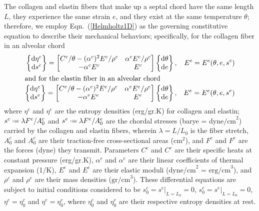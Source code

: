The collagen and elastin fibers that make up a septal chord have the same length $L$, they experience the same strain $e$, and they exist at the same temperature $\theta$; therefore, we employ Eqn.~(\ref{Helmholtz1D}) as the governing constitutive equation to describe their mechanical behaviors; specifically, for the collagen fiber in an alveolar chord
\begin{subequations}
    \label{alveolarChord}
    \begin{align}
    \left\{ \begin{matrix} 
    \mathrm{d} \eta^c \\ \mathrm{d} s^c
    \end{matrix} \right\} = \begin{bmatrix}
    C^c / \theta - ( \alpha^c )^2 E^c / \rho^c & \alpha^c E^c / \rho^c \\
    -\alpha^c E^c & E^c
    \end{bmatrix} \left\{ \begin{matrix}
    \mathrm{d} \theta \\ \mathrm{d} e
    \end{matrix} \right\} , & & 
    E^c = E^c ( \theta , e , s^c ) \\
    \intertext{and for the elastin fiber in an alveolar chord}
    \left\{ \begin{matrix} 
    \mathrm{d} \eta^e \\ \mathrm{d} s^e
    \end{matrix} \right\} = \begin{bmatrix}
    C^e / \theta - ( \alpha^e )^2 E^e / \rho^e & \alpha^e E^e / \rho^e \\
    -\alpha^e E^e & E^e
    \end{bmatrix} \left\{ \begin{matrix}
    \mathrm{d} \theta \\ \mathrm{d} e
    \end{matrix} \right\} , & &
    E^e = E^e ( \theta , e , s^e )
    \end{align}
\end{subequations}
where $\eta^c$ and $\eta^e$ are the entropy densities (erg/gr.K) for collagen and elastin; $s^c \defeq \lambda F^c / A^c_0$ and $s^e \defeq \lambda F^e / A_0^e$ are the chordal stresses (barye = $\text{dyne/cm}^2$) carried by the collagen and elastin fibers, wherein $\lambda = L/L_0$ is the fiber stretch, $A^c_0$ and $A^e_0$ are their traction-free cross-sectional areas ($\text{cm}^2$), and $F^c$ and $F^e$ are the forces (dyne) they transmit.  Parameters $C^c$ and $C^e$ are their specific heats at constant pressure (erg/gr.K), $\alpha^c$ and $\alpha^e$ are their linear coefficients of thermal expansion (1/K), $E^e$ and $E^e$ are their elastic moduli ($\text{dyne/cm}^2$ = $\text{erg/cm}^3$), and $\rho^c$ and $\rho^e$ are their mass densities ($\text{gr/cm}^3$).  These differential equations are subject to initial conditions considered to be $s^c_0 = s^c |_{L = L_0} = 0$, $s^e_0 = s^e |_{L = L_0} = 0$, $\eta^c = \eta^c_0$ and $\eta^e = \eta^e_0$, where  $\eta_0^c$ and $\eta_0^e$ are their respective entropy densities at rest.

